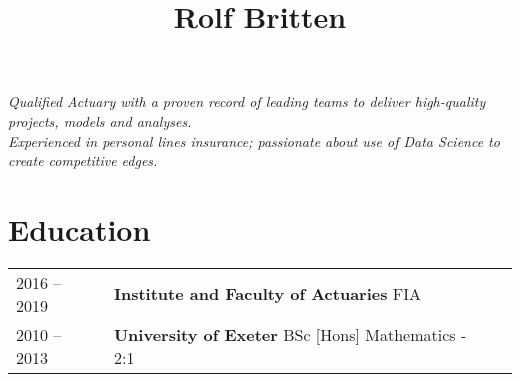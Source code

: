 \documentclass[11pt]{article}
\title{\bfseries \Huge Rolf Britten}
\date{}
\begin{document}
\vspace{-40mm}
\maketitle
\vspace{-24mm}

\begin{center} \emph{Qualified Actuary with a proven record of leading teams to deliver high-quality projects, models and analyses.\\Experienced in personal lines insurance; passionate about use of Data Science to create competitive edges.} \end{center}

\section*{Education}
\begin{tabular}{l | l l}
2016 -- 2019 & \textbf{Institute and Faculty of Actuaries} FIA \\
2010 -- 2013 & \textbf{University of Exeter} BSc [Hons] Mathematics - 2:1\\
\end{tabular}
\end{document}
